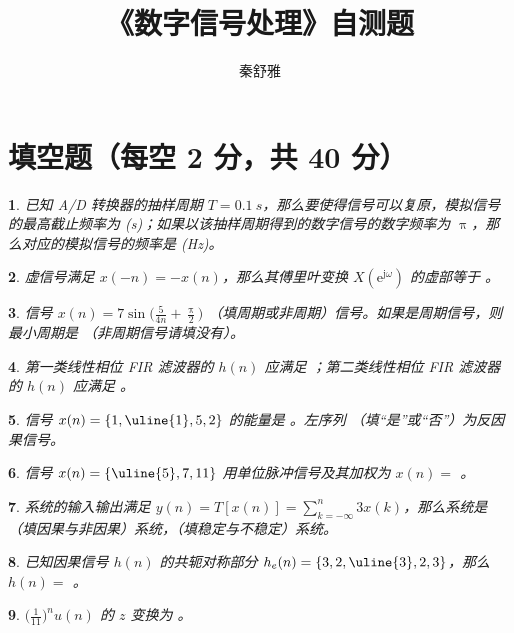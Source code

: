 \documentclass{ctexart}
\title{《数字信号处理》自测题}
\author{秦舒雅}
\theoremstyle{change}
\newtheorem{ti}{}[section]
\def\hua{\mbox{\uline{\hspace{2.5cm}}}}
\def\ee{\mathrm{e}}
\def\jj{\mathrm{j}}
\begin{document}
\maketitle
\section{填空题（每空 2 分，共 40 分）}
\begin{ti}
	已知 A/D 转换器的抽样周期 $T = \SI{0.1}{s}$，那么要使得信号可以复原，模拟信号的最高截止频率为 \hua (\si{s})；如果以该抽样周期得到的数字信号的数字频率为 $\uppi$，那么对应的模拟信号的频率是 \hua (\si{Hz})。
\end{ti}

\begin{ti}
	虚信号满足 $x(-n) = - x(n)$，那么其傅里叶变换 $X(\ee^{\jj \omega})$ 的虚部等于 \hua 。
\end{ti}

\begin{ti}
	信号 $x(n) = 7 \sin \bigl( \frac{5}{4n} + \frac{\uppi}{2} \bigr)$ \hua （填周期或非周期）信号。如果是周期信号，则最小周期是 \hua （非周期信号请填没有）。
\end{ti}

\begin{ti}
	第一类线性相位 FIR 滤波器的 $h(n)$ 应满足 \hua ；第二类线性相位 FIR 滤波器的 $h(n)$ 应满足 \hua 。
\end{ti}

\begin{ti}
	信号 $x(n) = \{ 1,\uline{1},5,2 \}$ 的能量是 \hua 。左序列 \hua （填“是”或“否”）为反因果信号。
\end{ti}

\begin{ti}
	信号 $x(n) = \{ \uline{5},7,11 \}$ 用单位脉冲信号及其加权为 $x(n) = $ \hua 。
\end{ti}

\begin{ti}
	系统的输入输出满足 $y(n) = T[x(n)] = \sum_{k = -\infty}^{n} 3 x(k)$，那么系统是 \hua （填因果与非因果）系统，\hua （填稳定与不稳定）系统。
\end{ti}

\begin{ti}
	已知因果信号 $h(n)$ 的共轭对称部分 $h_{e}(n) = \{ 3,2,\uline{3},2,3 \}$，那么 $h(n) = $ \hua 。
\end{ti}

\begin{ti}
	$\bigl( \frac{1}{11} \bigr)^{n} u(n)$ 的 $z$ 变换为 \hua 。
\end{ti}
\end{document}

